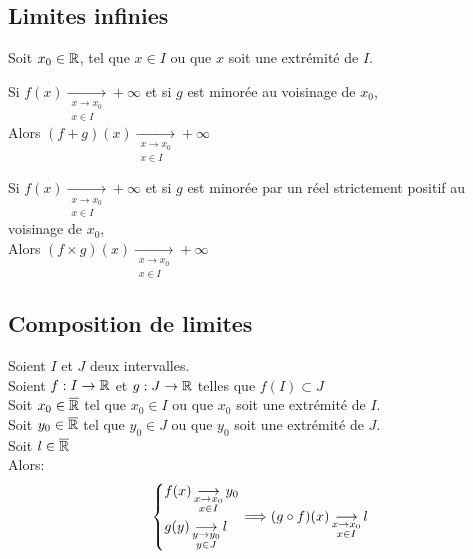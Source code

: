 \documentclass[12pt,twoside,a4paper]{article}
\begin{document}
		\subsection{Limites infinies}
			Soit $x_0\in\mathbb{R}$, tel que $x\in I$ ou que $x$ soit une extr\'emit\'e de $I$.
			\begin{liste}
				\item Si $f(x)\mathop{\longrightarrow}\limits_{\substack{x\rightarrow x_0\\x\in I}}+\infty$ et si $g$ est minor\'ee au voisinage de $x_0$,\\
					Alors $(f+g)(x)\mathop{\longrightarrow}\limits_{\substack{x\rightarrow x_0\\x\in I}}+\infty$\\
				\item Si $f(x)\mathop{\longrightarrow}\limits_{\substack{x\rightarrow x_0\\x\in I}}+\infty$ et si $g$ est minor\'ee par un r\'eel strictement positif au voisinage de $x_0$,\\
					Alors $(f\times g)(x)\mathop{\longrightarrow}\limits_{\substack{x\rightarrow x_0\\x\in I}}+\infty$
			\end{liste}
		\newpage
		\subsection{Composition de limites}
			Soient $I$ et $J$ deux intervalles.\\
			Soient $f:I\rightarrow \mathbb{R}$ et $g:J\rightarrow\mathbb{R}$ telles que $f(I)\subset J$\\
			Soit $x_0\in \overline{\mathbb{R}}$ tel que $x_0\in I$ ou que $x_0$ soit une extr\'emit\'e de $I$.\\
			Soit $y_0\in \overline{\mathbb{R}}$ tel que $y_0\in J$ ou que $y_0$ soit une extr\'emit\'e de $J$.\\
			Soit $l\in\overline{\mathbb{R}}$\\
			Alors:
			$$\left\{\begin{aligned}& f(x)\mathop{\longrightarrow}\limits_{\substack{x\rightarrow x_0\\x\in I}} y_0\\ & g(y)\mathop{\longrightarrow}\limits_{\substack{y\rightarrow y_0\\y\in J}}l\end{aligned}\right.\Longrightarrow (g\circ f)(x) \mathop{\longrightarrow}\limits_{\substack{x\rightarrow x_0\\x\in I}}l$$
\end{document}

